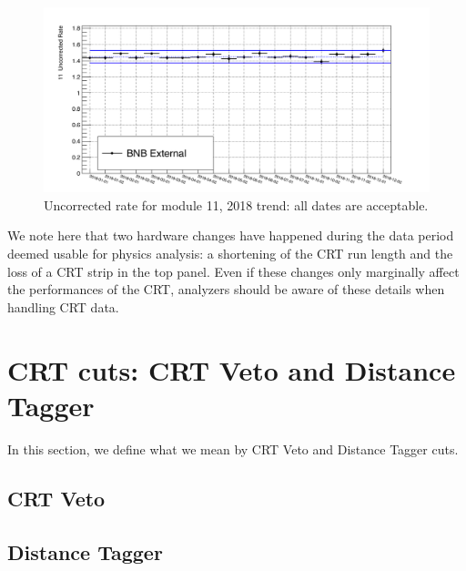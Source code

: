 \begin{figure}[h!]
\centering
\includegraphics[scale=0.4]{images/hHitsOverEvt_FEB_11.png}
\caption{Uncorrected rate for module 11, 2018 trend: all dates are acceptable.}
\label{Annual11_ex}
\end{figure}


We note here that two hardware changes have happened during the data period deemed usable for physics analysis: a shortening of the CRT run length and the loss of a CRT strip in the top panel. Even if these changes only marginally affect the performances of the CRT, analyzers should be aware of these details when handling CRT data.



\section{CRT cuts: CRT Veto and Distance Tagger}\label{sec:Cuts}
In this section, we define what we mean by  CRT Veto and Distance Tagger cuts.
\subsection{CRT Veto}\label{sec:VetoCuts}
\subsection{Distance Tagger}\label{sec:DistCuts}

\newpage
